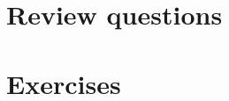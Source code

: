\documentclass[12pt]{article}
\begin{document}
\maketitle


\begin{enumerate}
\section*{Review questions}








\section*{Exercises}







\end{enumerate}
\end{document}
